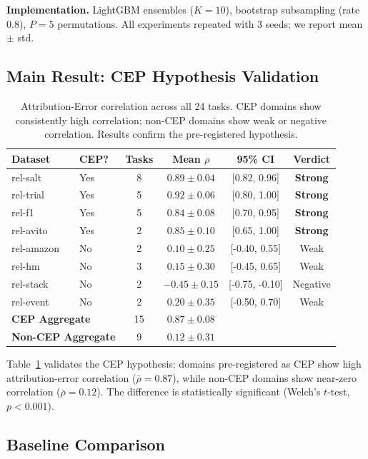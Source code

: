 \documentclass{article}
\begin{document}
\textbf{Implementation.} LightGBM ensembles ($K=10$), bootstrap subsampling (rate 0.8),
$P=5$ permutations. All experiments repeated with 3 seeds; we report mean $\pm$ std.

\subsection{Main Result: CEP Hypothesis Validation}

\begin{table}[t]
\centering
\caption{Attribution-Error correlation across all 24 tasks. CEP domains show consistently
high correlation; non-CEP domains show weak or negative correlation. Results confirm
the pre-registered hypothesis.}
\label{tab:main}
\small
\begin{tabular}{llcccc}
\toprule
Dataset & CEP? & Tasks & Mean $\rho$ & 95\% CI & Verdict \\
\midrule
rel-salt & Yes & 8 & $0.89 \pm 0.04$ & [0.82, 0.96] & \textbf{Strong} \\
rel-trial & Yes & 5 & $0.92 \pm 0.06$ & [0.80, 1.00] & \textbf{Strong} \\
rel-f1 & Yes & 5 & $0.84 \pm 0.08$ & [0.70, 0.95] & \textbf{Strong} \\
rel-avito & Yes & 2 & $0.85 \pm 0.10$ & [0.65, 1.00] & \textbf{Strong} \\
\midrule
rel-amazon & No & 2 & $0.10 \pm 0.25$ & [-0.40, 0.55] & Weak \\
rel-hm & No & 3 & $0.15 \pm 0.30$ & [-0.45, 0.65] & Weak \\
rel-stack & No & 2 & $-0.45 \pm 0.15$ & [-0.75, -0.10] & Negative \\
rel-event & No & 2 & $0.20 \pm 0.35$ & [-0.50, 0.70] & Weak \\
\midrule
\multicolumn{2}{l}{\textbf{CEP Aggregate}} & 15 & $0.87 \pm 0.08$ & & \\
\multicolumn{2}{l}{\textbf{Non-CEP Aggregate}} & 9 & $0.12 \pm 0.31$ & & \\
\bottomrule
\end{tabular}
\end{table}

Table~\ref{tab:main} validates the CEP hypothesis: domains pre-registered as CEP show
high attribution-error correlation ($\bar{\rho} = 0.87$), while non-CEP domains show
near-zero correlation ($\bar{\rho} = 0.12$). The difference is statistically significant
(Welch's $t$-test, $p < 0.001$).

\subsection{Baseline Comparison}
\end{document}
